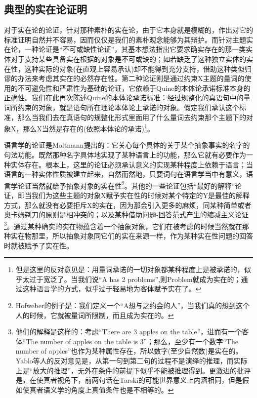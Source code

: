 \documentclass{article}
\begin{document}
\subsection{典型的实在论证明}
对于实在论的论证，针对那种素朴的实在论，由于它本身就是模糊的，作出对它的标准证明自然并不容易，因而仅仅是我们的素朴观念能够为其辩护。而针对主题实在论，一种论证是“不可或缺性论证”，其基本想法指出它要求确实存在的那一类实体对于支持某些具备实在根据的对象是不可或缺的；如若缺乏了这种独立实体的实在性，这种实际的对象(在直观上容易承认)却不能得到充分支持，借助这种类似归谬的办法来考虑其实在的必然存在性。第二种论证则是通过约束X主题的量词的使用的不可避免性和严肃性为基础的论证，它依赖于Quine的本体论承诺标准本身的正确性。我们在此再次陈述Quine的本体论承诺标准：{\heiti 经过规整化的真语句中的量词所约束的对象，就是语句所在理论本体论上承诺的对象。}假定我们承认这个标准，那么当我们去在真语句的规整化形式里面用了什么量词去约束那个主题下的对象X，那么X当然是存在的(依照本体论的承诺)\footnote{但是这里的反对意见是：用量词承诺的一切对象都某种程度上是被承诺的，似乎太过于宽泛了。当我们说“A has 2 problems”,则Problem就成为实在的；通过这种语言学的方式，似乎过于轻易地为客体赋予实在了。}。

语言学的论证是Moltmann提出的：它关心每个具体的关于某个抽象事实的名字的句法功能。既然那种名字具体地实现了某种语言上的功能，那么它就有必要作为一种实体存在。根本上，这里的论证必须承认意义的实现某种程度上依赖于语言；当语言的一种实体性质被建立起来，自然而然地，只要词句在语言学当中有意义，语言学论证当然就给予抽象对象的实在性\footnote{Hofweber的例子是：我们定义一个“A想与之约会的人”，当我们真的想到这个人的时候，它就被量词所限制，而且成为实在的。}。其他的一些论证包括“最好的解释”论证，即当我们为这些主题的对象X赋予实在性的时候对某个特定的Y是最佳的解释方式，那么就没有必要拒斥X的实在，因为那会引入更多的麻烦，同某种简单或者奥卡姆剃刀的原则是相冲突的；以及某种借助问题-回答范式产生的缩减主义论证\footnote{他们的解释是这样的：考虑“There are 3 apples on the table”，进而有一个客体“The number of apples on the table is 3”；那么，至少有一个数字“The number of apples”也作为某种属性存在，所以数字(至少自然数)是实在的。Yablo等人的反对意见是，从第一句到第二句的过程不是演绎的推理，而实际上是“放大的推理”，无外在条件的前提下似乎不能被推理得到。更激进的批评是，在使真者视角下，前两句话在Tarski的可能世界意义上内涵相同，但是假如使真者语义学的角度上真值条件也是不相等的。}。通过某种确实的实在物蕴含着一个抽象对象，它们在被考虑的时候当然就在那种实在物那里，所以抽象对象同它们的实在来源一样，作为某种实在性问题的回答时就被赋予了实在性。
\end{document}

